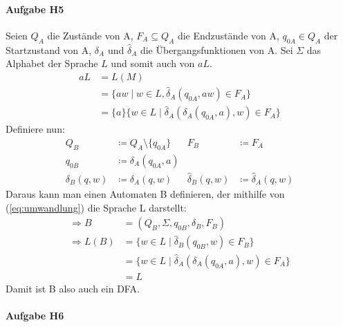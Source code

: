 \documentclass[11pt]{article}
\begin{document}
\paragraph{Aufgabe H5}
Seien $Q_{A}$ die Zustände von A, $F_{A}\subseteq Q_{A}$ die Endzustände von A, $q_{0A}\in Q_{A}$ der Startzustand von A, $\delta_{A}$ und $\hat{\delta}_{A}$ die Übergangsfunktionen von A. Sei $\Sigma$ das Alphabet der Sprache $L$ und somit auch von $aL$.
\begin{equation}\label{eq:umwandlung}
\begin{split}
aL &= L(M)\\
&= \{aw\mid w\in L, \hat{\delta}_{A}(q_{0A}, aw)\in F_{A}\}\\
&= \{a\}\{w\in L\mid \hat{\delta}_{A}(\delta_{A}(q_{0A}, a), w)\in F_{A}\}
\end{split}
\end{equation}
Definiere nun: 
\begin{align*}
Q_{B}&\coloneqq Q_{A}\setminus\{q_{0A}\} & F_{B}&\coloneqq F_{A}\\
q_{0B}&\coloneqq\delta_{A}(q_{0A},a)\\
\delta_{B}(q,w)&\coloneqq\delta_{A}(q,w) & \hat{\delta}_{B}(q,w)&\coloneqq\hat{\delta}_{A}(q,w)
\end{align*}
Daraus kann man einen Automaten B definieren, der mithilfe von (\ref{eq:umwandlung}) die Sprache L darstellt:
\begin{align*}
\Rightarrow B&=(Q_{B},\Sigma, q_{0B}, \delta_{B}, F_{B})\\
\Rightarrow L(B)&=\{w\in L\mid \hat{\delta}_{B}(q_{0B},w)\in F_{B}\}\\
				&=\{w\in L\mid \hat{\delta}_{A}(\delta_{A}(q_{0A}, a), w)\in F_{A}\}\\
				&=L
\end{align*}
Damit ist B also auch ein DFA.

\paragraph{Aufgabe H6}
\begin{center}
\end{center}
\end{document}
